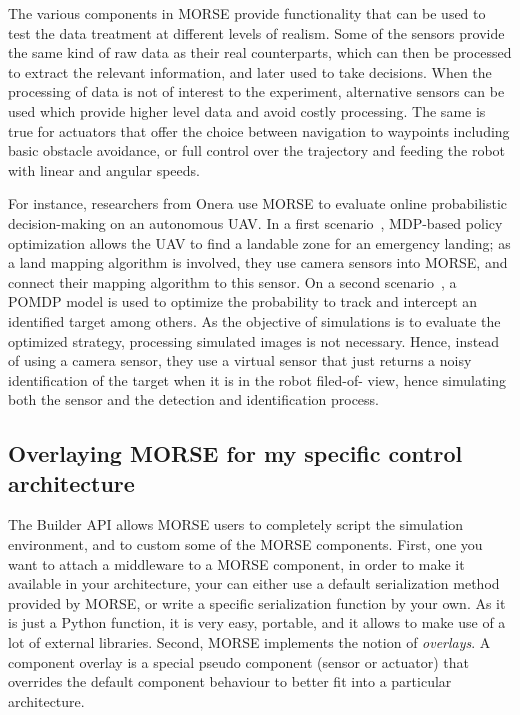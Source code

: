 \documentclass{llncs}
\begin{document}
The various components in MORSE provide functionality that can be used to test
the data treatment at different levels of realism. Some of the sensors provide
the same kind of raw data as their real counterparts, which can then be
processed to extract the relevant information, and later used to take
decisions. When the processing of data is not of interest to the experiment,
alternative sensors can be used which provide higher level data and avoid
costly processing. The same is true for actuators that offer the choice
between navigation to waypoints including basic obstacle avoidance, or full
control over the trajectory and feeding the robot with linear and angular
speeds.


%
%
For instance, researchers from Onera use MORSE to evaluate online probabilistic
decision-making on an autonomous UAV. In a first scenario~\cite{teichteil2011},
MDP-based policy optimization allows the UAV to find a landable zone for an emergency landing;
as a land mapping algorithm is involved, they use camera sensors into MORSE, and connect
their mapping algorithm to this sensor. On a second scenario~\cite{carvalho2012},
a POMDP model is used to optimize the probability to track and intercept an identified target
among others. As the objective of simulations is to evaluate the optimized strategy,
processing simulated images is not necessary. Hence, instead of using a camera sensor, they use
a virtual sensor that just returns a noisy identification of the target when it is in the robot filed-of-
view, hence simulating both the sensor and the detection and identification process.

\subsection{Overlaying MORSE for my specific control architecture}

The Builder API allows MORSE users to completely script the simulation
environment, and to custom some of the MORSE components.
First, one you want to attach a middleware to a MORSE component, in order
to make it available in your architecture, your can either use a default
serialization method provided by MORSE, or write a specific serialization function
by your own. As it is just a Python function, it is very easy, portable, and it allows to make
use of a lot of external libraries.
%
Second, MORSE implements the notion of {\em overlays}. A component overlay is a special pseudo
component (sensor or actuator) that overrides the default component behaviour to better fit into a
particular architecture.
\end{document}
